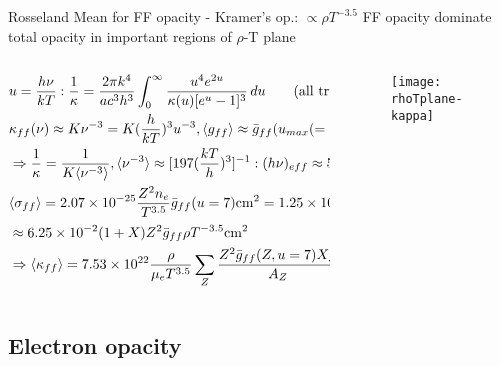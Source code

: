 \begin{frame}{Rosseland Mean for FF opacity - Kramer's op.: $\propto\rho T^{-3.5}$}
    FF opacity dominate total opacity in important regions of $\rho$-T plane
    \begin{columns}[T]
        \begin{column}{0.65\textwidth}
            \begin{align*}
                &u=\frac{h\nu}{kT}: \frac{1}{\kappa}=\frac{2\pi k^4}{ac^3h^3}\int_0^{\infty}\frac{u^4\exp{2u}}{\kappa(u)[\exp{u}-1]^3}\,du\tag{all true abs}\\
                &\kappa_{ff}(\nu)\approx K\nu^{-3}=K(\frac{h}{kT})^3u^{-3}, \exv{g_{ff}}\approx\bar{g}_{ff}(u_{max}(=7))\tag{ignoring deps g on $\nu$}\\
                &\Rightarrow \frac{1}{\kappa}=\frac{1}{K\exv{\nu^{-3}}}, \exv{\nu^{-3}}\approx[197(\frac{kT}{h})^3]^{-1}:(h\nu)_{eff}\approx5.82kT\\
                &\exv{\sigma_{ff}}=\num{2.07e-25}\frac{Z^2n_e}{T^{3.5}}\bar{g}_{ff}(u=7)\si{\square\cm}=\num{1.25e-1}\frac{Z^2\bar{g}_{ff}}{\mu_e}\frac{\rho}{T^{3.5}}\si{\square\cm}\\
                &\approx\num{6.25e-2}(1+X)Z^2\bar{g}_{ff}\rho T^{-3.5}\si{\square\cm}\\
                &\Rightarrow\exv{\kappa_{ff}}=\num{7.53e22}\frac{\rho}{\mu_eT^{3.5}}\sum_Z \frac{Z^2\bar{g}_{ff}(Z,u=7)X_Z}{A_Z}\si{\square\cm\per\gram}
            \end{align*}
        \end{column}
        \begin{column}{0.35\textwidth}
            \begin{figure}[!ht]
                \texttt{[image: rhoTplane-kappa]}\label{fig:rhoTplane-kappa}
			\end{figure}
        \end{column}
    \end{columns}
    
\end{frame}

\subsection{Electron opacity}

